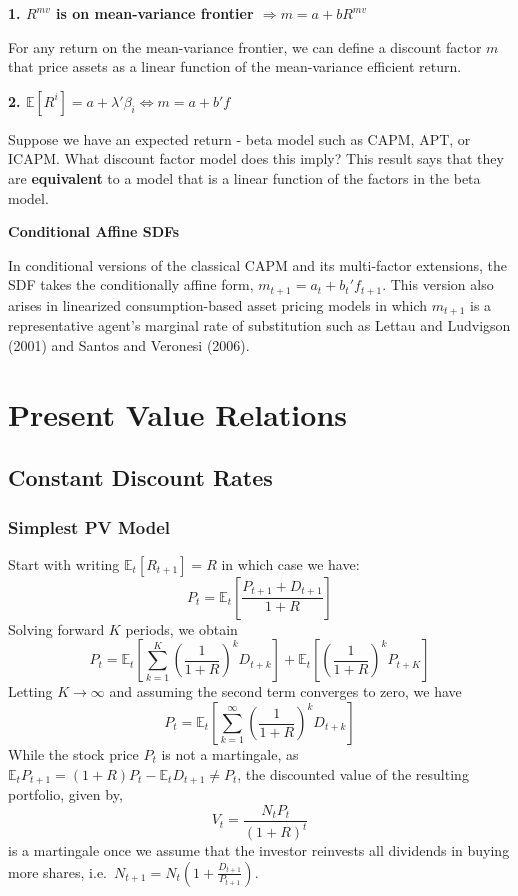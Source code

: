 \documentclass[
]{book}
\begin{document}
\textbf{1. \(R^{mv}\) is on mean-variance frontier \(\Rightarrow m = a+bR^{mv}\)}

For any return on the mean-variance frontier, we can define a discount factor \(m\) that price assets as a linear function of the mean-variance efficient return.

\textbf{2. \(\mathbb{E}[R^i] = a + \lambda'\beta_i \Leftrightarrow m = a + b'f\)}

Suppose we have an expected return - beta model such as CAPM, APT, or ICAPM. What discount factor model does this imply? This result says that they are \textbf{equivalent } to a model that is a linear function of the factors in the beta model.

\textbf{Conditional Affine SDFs}

In conditional versions of the classical CAPM and its multi-factor extensions, the SDF takes the conditionally affine form, \(m_{t+1} = a_t + b_t'f_{t+1}\). This version also arises in linearized consumption-based asset pricing models in which \(m_{t+1}\) is a representative agent's marginal rate of substitution such as Lettau and Ludvigson (2001) and Santos and Veronesi (2006).

\hypertarget{present-value-relations}{%
\chapter{Present Value Relations}\label{present-value-relations}}

\hypertarget{constant-discount-rates}{%
\section{Constant Discount Rates}\label{constant-discount-rates}}

\hypertarget{simplest-pv-model}{%
\subsection{\texorpdfstring{\textbf{Simplest PV Model}}{Simplest PV Model}}\label{simplest-pv-model}}

Start with writing \(\mathbb{E}_{t}\left[R_{t+1}\right]=R\) in which case we have:
\[
P_{t}=\mathbb{E}_{t}\left[\frac{P_{t+1}+D_{t+1}}{1+R}\right]
\]
Solving forward \(K\) periods, we obtain
\[
P_{t}=\mathbb{E}_{t}\left[\sum_{k=1}^{K}\left(\frac{1}{1+R}\right)^{k}D_{t+k}\right]+\mathbb{E}_{t}\left[\left(\frac{1}{1+R}\right)^{k}P_{t+K}\right]
\]
Letting \(K\to\infty\) and assuming the second term converges to zero, we have
\[
P_{t}=\mathbb{E}_{t}\left[\sum_{k=1}^{\infty}\left(\frac{1}{1+R}\right)^{k}D_{t+k}\right]
\]
While the stock price \(P_t\) is not a martingale, as \(\mathbb{E}_{t}P_{t+1}=\left(1+R\right)P_{t}-\mathbb{E}_{t}D_{t+1}\neq P_{t}\), the discounted value of the resulting portfolio, given by,
\[
V_{t}=\frac{N_{t}P_{t}}{\left(1+R\right)^{t}}
\]
is a martingale once we assume that the investor reinvests all dividends in buying more shares, i.e.~\(N_{t+1}=N_{t}\left(1+\frac{D_{t+1}}{P_{t+1}}\right)\).
\end{document}
